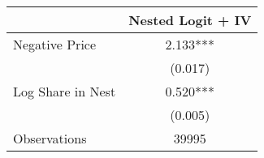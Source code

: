 \begin{tabular}{lc}
\hline
& Nested Logit + IV \\
\hline
Negative Price & 2.133*** \\
 & (0.017) \\

Log Share in Nest & 0.520*** \\
 & (0.005) \\
\hline
Observations & 39995 \\
\hline
\end{tabular}